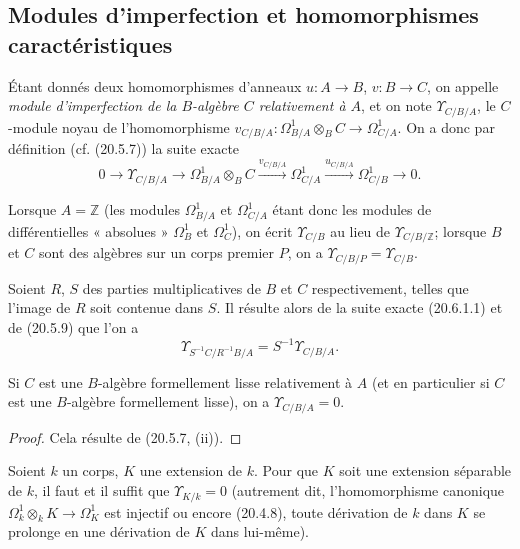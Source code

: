 \subsection{Modules d'imperfection et homomorphismes caractéristiques}
\label{subsection:0.20.6-fr}
\label{0.20.6-fr}

\begin{definition}[20.6.1]
\label{0.20.6.1-fr}
Étant donnés deux homomorphismes d'anneaux $u:A\to B$, $v:B\to C$, on
appelle \emph{module d'imperfection de la $B$-algèbre $C$ relativement à
$A$}, et on note $\Upsilon_{C/B/A}$, le $C$-module noyau de
l'homomorphisme
$v_{C/B/A}:\Omega^1_{B/A}\otimes_B C\to\Omega^1_{C/A}$.
On a donc par définition (cf. (20.5.7)) la suite exacte
\begin{equation}
\tag{20.6.1.1}
\label{0.20.6.1.1-fr}
  0\longrightarrow\Upsilon_{C/B/A}\longrightarrow
  \Omega^1_{B/A}\otimes_B C\xrightarrow{v_{C/B/A}}
  \Omega^1_{C/A}\xrightarrow{u_{C/B/A}}\Omega^1_{C/B}
  \longrightarrow0.
\end{equation}
\end{definition}

Lorsque $A=\mathbb{Z}$ (les modules $\Omega^1_{B/A}$ et $\Omega^1_{C/A}$
étant donc les modules de différentielles « absolues » $\Omega^1_B$ et
$\Omega^1_C$), on écrit $\Upsilon_{C/B}$ au lieu de
$\Upsilon_{C/B/\mathbb{Z}}$; lorsque $B$ et $C$ sont des algèbres sur un
corps premier $P$, on a $\Upsilon_{C/B/P}=\Upsilon_{C/B}$.

Soient $R$, $S$ des parties multiplicatives de $B$ et $C$ respectivement,
telles que l'image de $R$ soit contenue dans $S$. Il résulte alors de la
suite exacte (20.6.1.1) et de (20.5.9) que l'on a
\begin{equation}
\tag{20.6.1.2}
\label{0.20.6.1.2-fr}
  \Upsilon_{S^{-1}C/R^{-1}B/A}=S^{-1}\Upsilon_{C/B/A}.
\end{equation}

\begin{proposition}[20.6.2]
\label{0.20.6.2-fr}
Si $C$ est une $B$-algèbre formellement lisse relativement à $A$ (et en
particulier si $C$ est une $B$-algèbre formellement lisse), on a
$\Upsilon_{C/B/A}=0$.
\end{proposition}

\begin{proof}
Cela résulte de (20.5.7, (ii)).
\end{proof}

\begin{proposition}[20.6.3]
\label{0.20.6.3-fr}
Soient $k$ un corps, $K$ une extension de $k$. Pour que $K$ soit une
extension séparable de $k$, il faut et il suffit que $\Upsilon_{K/k}=0$
(autrement dit, l'homomorphisme canonique
$\Omega^1_k\otimes_k K\to\Omega^1_K$ est injectif ou encore (20.4.8),
toute dérivation de $k$ dans $K$ se prolonge en une dérivation de $K$
dans lui-même).
\end{proposition}

